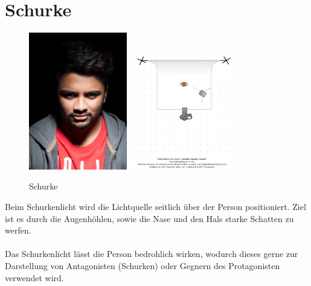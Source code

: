 \documentclass{school}
\begin{document}
\section{Schurke}
\begin{figure}[h]
	\centering
	\includegraphics[height=6cm]{3-schurke.jpg}
	\includegraphics[height=5cm]{3-schurke-diagram.png}
	\caption{Schurke}
\end{figure}

Beim Schurkenlicht wird die Lichtquelle seitlich über der Person positioniert. Ziel ist es durch die Augenhöhlen, sowie die Nase und den Hals starke Schatten zu werfen.
\\\\
Das Schurkenlicht lässt die Person bedrohlich wirken, wodurch dieses gerne zur Darstellung von Antagonisten (Schurken) oder Gegnern des Protagonisten verwendet wird.

\newpage
\end{document}
